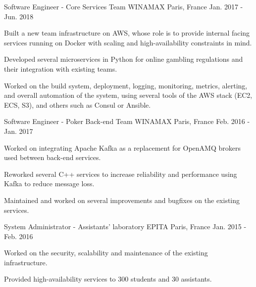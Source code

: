 

\begin{cventries}

  \cventry
    {Software Engineer - Core Services Team} %
    {WINAMAX} %
    {Paris, France} %
    {Jan. 2017 - Jun. 2018} %
    {
      \begin{cvitems} %
        \item {Built a new team infrastructure on AWS, whose role is to provide internal facing services running on Docker with scaling and high-availability constraints in mind.}
        \item {Developed several microservices in Python for online gambling regulations and their integration with existing teams.}
        \item {Worked on the build system, deployment, logging, monitoring, metrics, alerting, and overall automation of the system, using several tools of the AWS stack (EC2, ECS, S3), and others such as Consul or Ansible.}
      \end{cvitems}
    }
    
  \cventry
    {Software Engineer - Poker Back-end Team} %
    {WINAMAX} %
    {Paris, France} %
    {Feb. 2016 - Jan. 2017} %
    {
      \begin{cvitems} %
        \item {Worked on integrating Apache Kafka as a replacement for OpenAMQ brokers used between back-end services.}
        \item {Reworked several C++ services to increase reliability and performance using Kafka to reduce message loss.}
        \item {Maintained and worked on several improvements and bugfixes on the existing services.}
      \end{cvitems}
    }

  \cventry
    {System Administrator - Assistants' laboratory} %
    {EPITA} %
    {Paris, France} %
    {Jan. 2015 - Feb. 2016} %
    {
      \begin{cvitems} %
        \item {Worked on the security, scalability and maintenance of the existing infrastructure.}
       	\item {Provided high-availability services to 300 students and 30 assistants.}
      \end{cvitems}
    }



\end{cventries}

